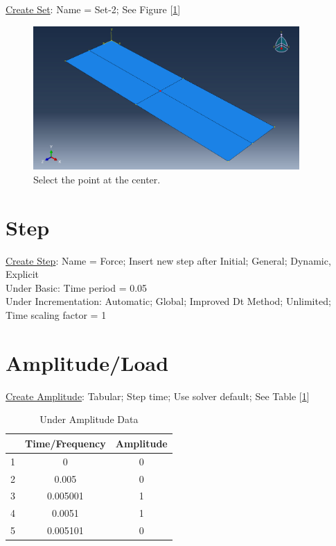\documentclass{article}
\begin{document}
	\underline{Create Set}: Name = Set-2; See Figure [\ref{fig:instance_set2}]
	\begin{figure}[H]
		\centering
		\includegraphics[width=4in]{Figures/instance_set2.png}
		\caption{Select the point at the center.}
		\label{fig:instance_set2}
	\end{figure}
	
	\section{Step}
	\underline{Create Step}: Name = Force; Insert new step after Initial; General; Dynamic, Explicit\\
	Under Basic: Time period = 0.05\\
	Under Incrementation: Automatic; Global; Improved Dt Method; Unlimited; Time scaling factor = 1
	
	\section{Amplitude/Load}
	\underline{Create Amplitude}: Tabular; Step time; Use solver default; See Table [\ref{tab:amplitude}]
	
	\begin{table}[H]
		\centering
		\caption{Under Amplitude Data}
		\label{tab:amplitude}
		\begin{tabular}{|c|c|c|}
			\hline
			 & Time/Frequency & Amplitude\\ \hline
			1 & 0 & 0 \\ %
			2 & 0.005 & 0 \\ %
			3 & 0.005001 & 1\\ %
			4 & 0.0051 & 1\\ %
			5 & 0.005101 & 0\\ \hline
		\end{tabular}
	\end{table}
	
\end{document}
